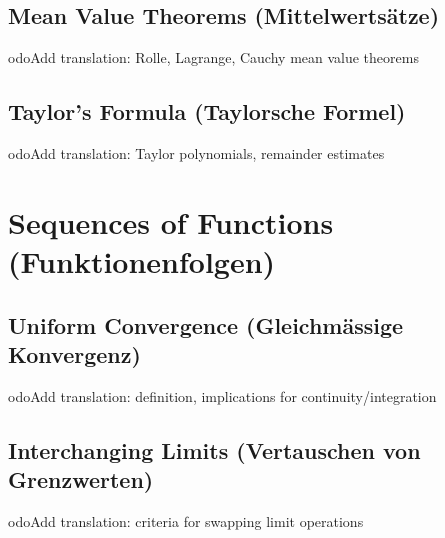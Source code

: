 \documentclass[12pt,a4paper]{article}
\theoremstyle{plain}
\theoremstyle{definition}
\theoremstyle{remark}
\begin{document}
\subsection{Mean Value Theorems (Mittelwertsätze)}
	odo{Add translation: Rolle, Lagrange, Cauchy mean value theorems}

\subsection{Taylor's Formula (Taylorsche Formel)}
	odo{Add translation: Taylor polynomials, remainder estimates}

\section{Sequences of Functions (Funktionenfolgen)}

\subsection{Uniform Convergence (Gleichmässige Konvergenz)}
	odo{Add translation: definition, implications for continuity/integration}

\subsection{Interchanging Limits (Vertauschen von Grenzwerten)}
	odo{Add translation: criteria for swapping limit operations}

\end{document}

